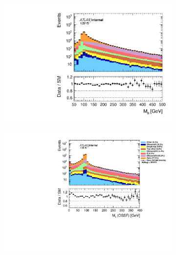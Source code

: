 \begin{figure}[H]
{\begin{subfigure}{.405\textwidth}
        \includegraphics[width=\textwidth]{Figures/FeaturesHistograms/MCvsData/mlll.pdf}
        \caption{}
        \label{fig:mlll}
    \end{subfigure}
    \hfill
    \begin{subfigure}{.525\textwidth}
        \includegraphics[width=\textwidth]{Figures/FeaturesHistograms/MCvsData/mll_OSSF.pdf}
        \caption{}
        \label{fig:mll_OSSF}
    \end{subfigure}
    }
\end{figure}
